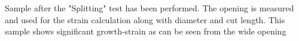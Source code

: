 Sample after the "Splitting" test has been performed. The opening is measured and used for the strain calculation along with diameter and cut length. This sample shows significant growth-strain as can be seen from the wide opening